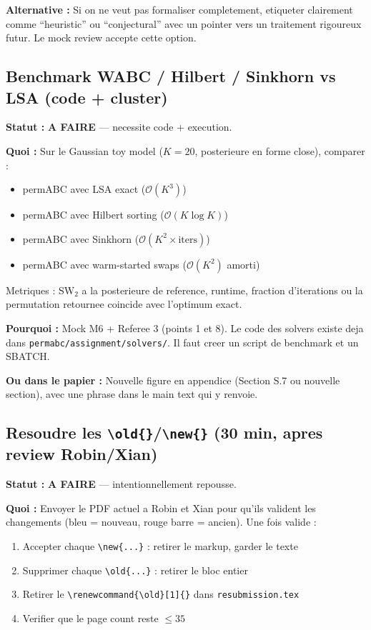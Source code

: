 \documentclass[11pt]{article}
\newcommand{\todo}{\textcolor{todo}{\textbf{A FAIRE}}}
\begin{document}
\textbf{Alternative :} Si on ne veut pas formaliser completement, etiqueter clairement comme ``heuristic'' ou ``conjectural'' avec un pointer vers un traitement rigoureux futur. Le mock review accepte cette option.

\subsection{Benchmark WABC / Hilbert / Sinkhorn vs LSA (code + cluster)}
\label{sec:wabc}

\textbf{Statut :} \todo{} --- necessite code + execution.

\textbf{Quoi :} Sur le Gaussian toy model ($K=20$, posterieure en forme close), comparer :
\begin{itemize}[nosep]
    \item permABC avec LSA exact ($\mathcal{O}(K^3)$)
    \item permABC avec Hilbert sorting ($\mathcal{O}(K\log K)$)
    \item permABC avec Sinkhorn ($\mathcal{O}(K^2 \times \text{iters})$)
    \item permABC avec warm-started swaps ($\mathcal{O}(K^2)$ amorti)
\end{itemize}

Metriques : SW$_2$ a la posterieure de reference, runtime, fraction d'iterations ou la permutation retournee coincide avec l'optimum exact.

\textbf{Pourquoi :} Mock M6 + Referee 3 (points 1 et 8). Le code des solvers existe deja dans \texttt{permabc/assignment/solvers/}. Il faut creer un script de benchmark et un SBATCH.

\textbf{Ou dans le papier :} Nouvelle figure en appendice (Section S.7 ou nouvelle section), avec une phrase dans le main text qui y renvoie.

\subsection{Resoudre les \texttt{\textbackslash old\{\}}/\texttt{\textbackslash new\{\}} (30 min, apres review Robin/Xian)}
\label{sec:oldnew}

\textbf{Statut :} \todo{} --- intentionnellement repousse.

\textbf{Quoi :} Envoyer le PDF actuel a Robin et Xian pour qu'ils valident les changements (bleu = nouveau, rouge barre = ancien). Une fois valide :
\begin{enumerate}[nosep]
    \item Accepter chaque \verb|\new{...}| : retirer le markup, garder le texte
    \item Supprimer chaque \verb|\old{...}| : retirer le bloc entier
    \item Retirer le \verb|\renewcommand{\old}[1]{}| dans \texttt{resubmission.tex}
    \item Verifier que le page count reste $\leq 35$
\end{enumerate}
\end{document}
